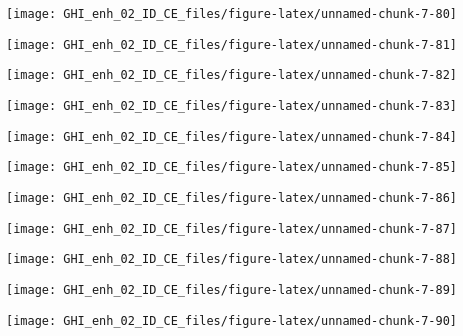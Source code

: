 \documentclass[
  10pt,
  a4paper,oneside]{article}
\begin{document}
\begin{center}\texttt{[image: GHI\_enh\_02\_ID\_CE\_files/figure-latex/unnamed-chunk-7-80]} \end{center}

\begin{center}\texttt{[image: GHI\_enh\_02\_ID\_CE\_files/figure-latex/unnamed-chunk-7-81]} \end{center}

\begin{center}\texttt{[image: GHI\_enh\_02\_ID\_CE\_files/figure-latex/unnamed-chunk-7-82]} \end{center}

\begin{center}\texttt{[image: GHI\_enh\_02\_ID\_CE\_files/figure-latex/unnamed-chunk-7-83]} \end{center}

\begin{center}\texttt{[image: GHI\_enh\_02\_ID\_CE\_files/figure-latex/unnamed-chunk-7-84]} \end{center}

\begin{center}\texttt{[image: GHI\_enh\_02\_ID\_CE\_files/figure-latex/unnamed-chunk-7-85]} \end{center}

\begin{center}\texttt{[image: GHI\_enh\_02\_ID\_CE\_files/figure-latex/unnamed-chunk-7-86]} \end{center}

\begin{center}\texttt{[image: GHI\_enh\_02\_ID\_CE\_files/figure-latex/unnamed-chunk-7-87]} \end{center}

\begin{center}\texttt{[image: GHI\_enh\_02\_ID\_CE\_files/figure-latex/unnamed-chunk-7-88]} \end{center}

\begin{center}\texttt{[image: GHI\_enh\_02\_ID\_CE\_files/figure-latex/unnamed-chunk-7-89]} \end{center}

\begin{center}\texttt{[image: GHI\_enh\_02\_ID\_CE\_files/figure-latex/unnamed-chunk-7-90]} \end{center}
\end{document}
